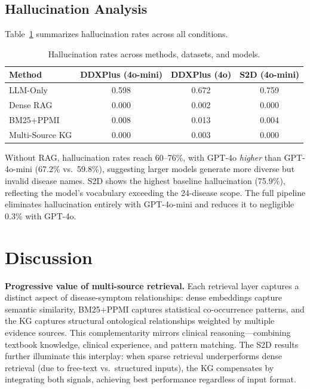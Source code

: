\documentclass[preprint,12pt]{elsarticle}
\begin{document}
\subsection{Hallucination Analysis}
\label{sec:hallucination}

Table~\ref{tab:halluc} summarizes hallucination rates across all conditions.

\begin{table}[t]
\centering
{\small
\caption{Hallucination rates across methods, datasets, and models.}
\label{tab:halluc}
\begin{tabular}{lccc}
\toprule
\textbf{Method} & \textbf{DDXPlus (4o-mini)} & \textbf{DDXPlus (4o)} & \textbf{S2D (4o-mini)} \\
\midrule
LLM-Only        & 0.598 & 0.672 & 0.759 \\
Dense RAG        & 0.000 & 0.002 & 0.000 \\
BM25+PPMI        & 0.008 & 0.013 & 0.004 \\
Multi-Source KG  & 0.000 & 0.003 & 0.000 \\
\bottomrule
\end{tabular}
}
\end{table}

Without RAG, hallucination rates reach 60--76\%, with GPT-4o \emph{higher} than GPT-4o-mini (67.2\% vs.\ 59.8\%), suggesting larger models generate more diverse but invalid disease names. S2D shows the highest baseline hallucination (75.9\%), reflecting the model's vocabulary exceeding the 24-disease scope. The full pipeline eliminates hallucination entirely with GPT-4o-mini and reduces it to negligible 0.3\% with GPT-4o.

\section{Discussion}
\label{sec:discussion}

\textbf{Progressive value of multi-source retrieval.} Each retrieval layer captures a distinct aspect of disease-symptom relationships: dense embeddings capture semantic similarity, BM25+PPMI captures statistical co-occurrence patterns, and the KG captures structural ontological relationships weighted by multiple evidence sources. This complementarity mirrors clinical reasoning---combining textbook knowledge, clinical experience, and pattern matching. The S2D results further illuminate this interplay: when sparse retrieval underperforms dense retrieval (due to free-text vs.\ structured inputs), the KG compensates by integrating both signals, achieving best performance regardless of input format.
\end{document}
